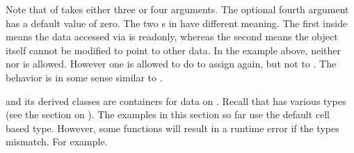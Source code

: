 \documentclass[letterpaper,10pt,english]{sphinxmanual}
\begin{document}
\sphinxAtStartPar
Note that  of  takes either three or
four arguments.  The optional fourth argument has a default value of
zero.  The two s in 
have different meaning.  The first  inside  means
the data accessed via  is read\sphinxhyphen{}only, whereas the second
 means the  object itself cannot be modified
to point to other data.  In the example above, neither  nor  is allowed.  However one is allowed to do
 to assign  again, but not to .
The behavior is in some sense similar to .

\sphinxAtStartPar
{} and its derived classes are containers for data on .
Recall that  has various types (see the section on {\hyperref[\detokenize{Basics:sec-basics-box}]{}}).
The examples in this section so far use the default cell based type.  However,
some functions will result in a runtime error if the types mismatch.  For
example.

\begin{sphinxVerbatim}[commandchars=\\\{\}]
              
      
 
 
   
\end{sphinxVerbatim}
\end{document}
